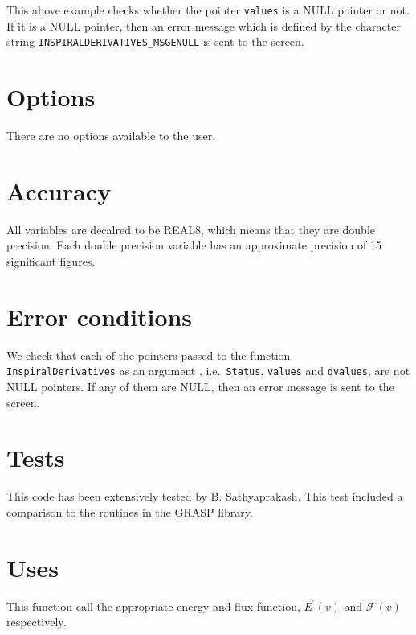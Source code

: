 \documentclass[12pt]{article}
\begin{document}
\vspace{5mm}

This above example checks whether the pointer \texttt{values} is a NULL pointer or not. If it is a NULL pointer, then an error message which is defined by the character string \texttt{INSPIRALDERIVATIVES\_MSGENULL} is sent to the screen.


\section{Options}

There are no options available to the user.

\section{Accuracy}

All variables are decalred to be REAL8, which means that they are double precision.
Each double precision variable has an approximate precision of 15 significant figures.


\section{Error conditions}

We check that each of the pointers passed to the function \\ \texttt{InspiralDerivatives} as an argument , i.e.\ \texttt{Status}, \texttt{values} and \texttt{dvalues}, are not NULL pointers. If any of them are NULL, then an error message is sent to the screen.


\section{Tests}

This code has been extensively tested by B. Sathyaprakash. This test included a comparison to the routines in the GRASP library.

\section{Uses}

This function call the appropriate energy and flux function, $E^{\prime}(v)$ and $\mathcal{F}(v)$ respectively.
\end{document}
